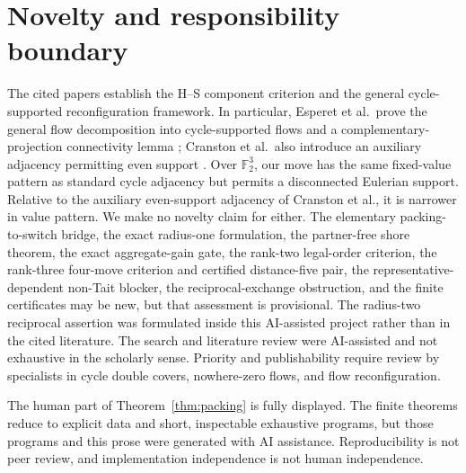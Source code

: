 \documentclass[11pt]{article}
\theoremstyle{definition}
\theoremstyle{remark}
\newcommand{\F}{\mathbb F}
\numberwithin{equation}{section}
\begin{document}
\section{Novelty and responsibility boundary}

The cited papers establish the H--S component criterion and the general
cycle-supported reconfiguration framework.  In particular,
Esperet et al.\ prove the general flow decomposition into
cycle-supported flows and a complementary-projection connectivity
lemma \cite{EsperetEtAl2026}; Cranston et al.\ also introduce an
auxiliary adjacency permitting even support
\cite{CranstonEtAl2026}.  Over \(\F_2^3\), our move has the same
fixed-value pattern as standard cycle adjacency but permits a
disconnected Eulerian support.  Relative to the auxiliary even-support
adjacency of Cranston et al., it is narrower in value pattern.  We make no novelty claim
for either.  The elementary packing-to-switch bridge, the exact
radius-one formulation, the partner-free shore theorem, the exact
aggregate-gain gate, the rank-two legal-order criterion, the
rank-three four-move criterion and certified distance-five pair, the
representative-dependent non-Tait blocker, the reciprocal-exchange
obstruction, and the finite certificates may be new, but that assessment
is provisional.
The radius-two reciprocal assertion was formulated inside this
AI-assisted project rather than in the cited literature.  The search and
literature review were AI-assisted and not exhaustive in the scholarly
sense.  Priority and publishability require review by specialists in
cycle double covers, nowhere-zero flows, and flow reconfiguration.

The human part of Theorem~\ref{thm:packing} is fully displayed.  The
finite theorems reduce to explicit data and short, inspectable exhaustive
programs, but those programs and this prose were generated with AI
assistance.  Reproducibility is not peer review, and implementation
independence is not human independence.



\end{document}
